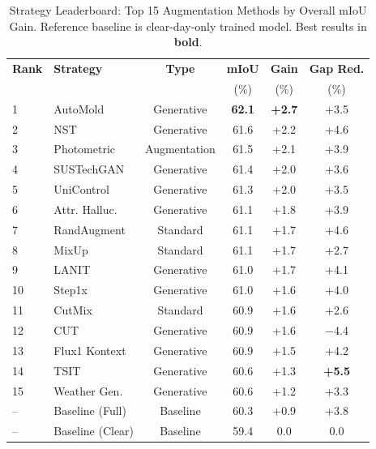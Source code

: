 


\begin{table}[t]
\centering
\caption{Strategy Leaderboard: Top 15 Augmentation Methods by Overall mIoU Gain. Reference baseline is clear-day-only trained model. Best results in \textbf{bold}.}
\label{tab:strategy_leaderboard}
\begin{tabular}{@{}llcccc@{}}
\toprule
\textbf{Rank} & \textbf{Strategy} & \textbf{Type} & \textbf{mIoU} & \textbf{Gain} & \textbf{Gap Red.} \\
 & & & (\%) & (\%) & (\%) \\
\midrule
1 & AutoMold & Generative & \textbf{62.1} & \textbf{+2.7} & +3.5 \\
2 & NST & Generative & 61.6 & +2.2 & +4.6 \\
3 & Photometric & Augmentation & 61.5 & +2.1 & +3.9 \\
4 & SUSTechGAN & Generative & 61.4 & +2.0 & +3.6 \\
5 & UniControl & Generative & 61.3 & +2.0 & +3.5 \\
6 & Attr. Halluc. & Generative & 61.1 & +1.8 & +3.9 \\
7 & RandAugment & Standard & 61.1 & +1.7 & +4.6 \\
8 & MixUp & Standard & 61.1 & +1.7 & +2.7 \\
9 & LANIT & Generative & 61.0 & +1.7 & +4.1 \\
10 & Step1x & Generative & 61.0 & +1.6 & +4.0 \\
11 & CutMix & Standard & 60.9 & +1.6 & +2.6 \\
12 & CUT & Generative & 60.9 & +1.6 & $-$4.4 \\
13 & Flux1 Kontext & Generative & 60.9 & +1.5 & +4.2 \\
14 & TSIT & Generative & 60.6 & +1.3 & \textbf{+5.5} \\
15 & Weather Gen. & Generative & 60.6 & +1.2 & +3.3 \\
\midrule
-- & Baseline (Full) & Baseline & 60.3 & +0.9 & +3.8 \\
-- & Baseline (Clear) & Baseline & 59.4 & 0.0 & 0.0 \\
\bottomrule
\end{tabular}
\end{table}


